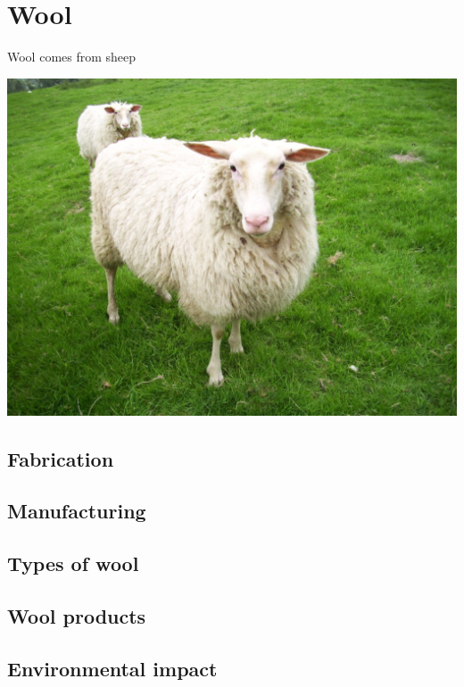\documentclass[11pt]{article}
\date{\today}
\title{}
\begin{document}
\tableofcontents

\section{Wool}
\label{sec:org10dc691}

Wool comes from sheep


\begin{center}
\includegraphics[width=.9\linewidth]{./sheep.jpg}
\end{center}


\subsection{Fabrication}
\label{sec:org33957df}

\subsection{Manufacturing}
\label{sec:org7c49b58}

\subsection{Types of wool}
\label{sec:org5635202}

\subsection{Wool products}
\label{sec:org2f2724d}

\subsection{Environmental impact}
\label{sec:orgf8bd901}
\end{document}
